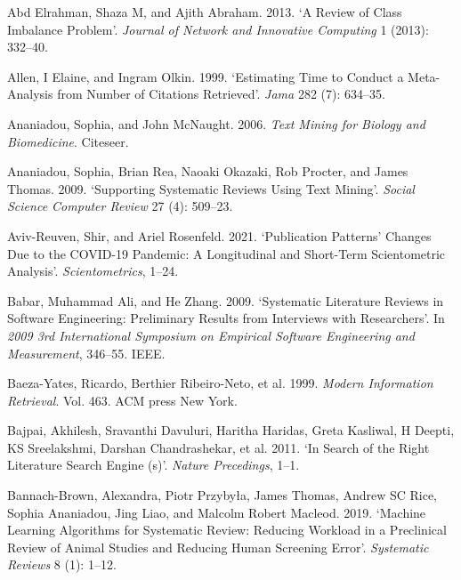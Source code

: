 \documentclass{article}
\newlength{\cslhangindent}
\newenvironment{CSLReferences}[2] %
 {%
  \setlength{\parindent}{0pt}
  \ifodd #1 \everypar{\setlength{\hangindent}{\cslhangindent}}\ignorespaces\fi
  \ifnum #2 > 0
  \setlength{\parskip}{#2\baselineskip}
  \fi
 }%
 {}
\begin{document}
\hypertarget{refs}{}
\begin{CSLReferences}{1}{0}
\leavevmode{}%
Abd Elrahman, Shaza M, and Ajith Abraham. 2013. {`A Review of Class
Imbalance Problem'}. \emph{Journal of Network and Innovative Computing}
1 (2013): 332--40.

\leavevmode{}%
Allen, I Elaine, and Ingram Olkin. 1999. {`Estimating Time to Conduct a
Meta-Analysis from Number of Citations Retrieved'}. \emph{Jama} 282 (7):
634--35.

\leavevmode{}%
Ananiadou, Sophia, and John McNaught. 2006. \emph{Text Mining for
Biology and Biomedicine}. Citeseer.

\leavevmode{}%
Ananiadou, Sophia, Brian Rea, Naoaki Okazaki, Rob Procter, and James
Thomas. 2009. {`Supporting Systematic Reviews Using Text Mining'}.
\emph{Social Science Computer Review} 27 (4): 509--23.

\leavevmode{}%
Aviv-Reuven, Shir, and Ariel Rosenfeld. 2021. {`Publication Patterns'
Changes Due to the COVID-19 Pandemic: A Longitudinal and Short-Term
Scientometric Analysis'}. \emph{Scientometrics}, 1--24.

\leavevmode{}%
Babar, Muhammad Ali, and He Zhang. 2009. {`Systematic Literature Reviews
in Software Engineering: Preliminary Results from Interviews with
Researchers'}. In \emph{2009 3rd International Symposium on Empirical
Software Engineering and Measurement}, 346--55. IEEE.

\leavevmode{}%
Baeza-Yates, Ricardo, Berthier Ribeiro-Neto, et al. 1999. \emph{Modern
Information Retrieval}. Vol. 463. ACM press New York.

\leavevmode{}%
Bajpai, Akhilesh, Sravanthi Davuluri, Haritha Haridas, Greta Kasliwal, H
Deepti, KS Sreelakshmi, Darshan Chandrashekar, et al. 2011. {`In Search
of the Right Literature Search Engine (s)'}. \emph{Nature Precedings},
1--1.

\leavevmode{}%
Bannach-Brown, Alexandra, Piotr Przybyła, James Thomas, Andrew SC Rice,
Sophia Ananiadou, Jing Liao, and Malcolm Robert Macleod. 2019. {`Machine
Learning Algorithms for Systematic Review: Reducing Workload in a
Preclinical Review of Animal Studies and Reducing Human Screening
Error'}. \emph{Systematic Reviews} 8 (1): 1--12.


\end{CSLReferences}
\end{document}
